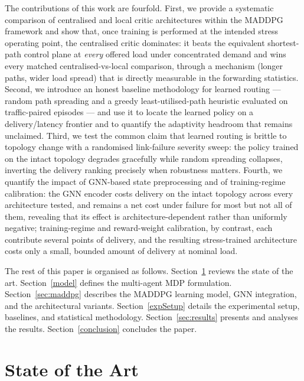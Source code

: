 \documentclass[10pt,journal,comsoc]{IEEEtran}
\begin{document}
The contributions of this work are fourfold. First, we provide a systematic comparison of centralised and local critic architectures within the MADDPG framework and show that, once training is performed at the intended stress operating point, the centralised critic dominates: it beats the equivalent shortest-path control plane at \emph{every} offered load under concentrated demand and wins every matched centralised-vs-local comparison, through a mechanism (longer paths, wider load spread) that is directly measurable in the forwarding statistics. Second, we introduce an honest baseline methodology for learned routing --- random path spreading and a greedy least-utilised-path heuristic evaluated on traffic-paired episodes --- and use it to locate the learned policy on a delivery/latency frontier and to quantify the adaptivity headroom that remains unclaimed. Third, we test the common claim that learned routing is brittle to topology change with a randomised link-failure severity sweep: the policy trained on the intact topology degrades gracefully while random spreading collapses, inverting the delivery ranking precisely when robustness matters. Fourth, we quantify the impact of GNN-based state preprocessing and of training-regime calibration: the GNN encoder costs delivery on the intact topology across every architecture tested, and remains a net cost under failure for most but not all of them, revealing that its effect is architecture-dependent rather than uniformly negative; training-regime and reward-weight calibration, by contrast, each contribute several points of delivery, and the resulting stress-trained architecture costs only a small, bounded amount of delivery at nominal load.

The rest of this paper is organised as follows. Section~\ref{State_of_Art} reviews the state of the art. Section~\ref{model} defines the multi-agent MDP formulation. Section~\ref{sec:maddpg} describes the MADDPG learning model, GNN integration, and the architectural variants. Section~\ref{expSetup} details the experimental setup, baselines, and statistical methodology. Section~\ref{sec:results} presents and analyses the results. Section~\ref{conclusion} concludes the paper.

\section{State of the Art} \label{State_of_Art}
\end{document}
